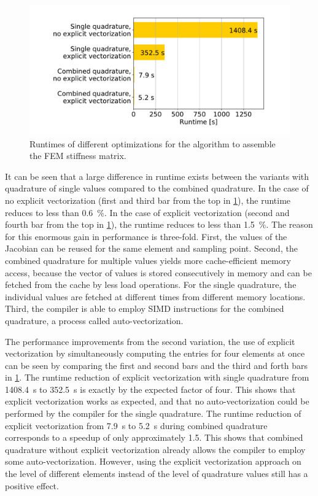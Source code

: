 \begin{figure}%
  \centering%
  \includegraphics[width=\textwidth]{images/implementation/matrix_runtimes.pdf}%
  \caption{Runtimes of different optimizations for the algorithm to assemble the FEM stiffness matrix.}%
  \label{fig:matrix_runtimes}%
\end{figure}%

It can be seen that a large difference in runtime exists between the variants with quadrature of single values compared to the combined quadrature. In the case of no explicit vectorization (first and third bar from the top in \cref{fig:matrix_runtimes}), the runtime reduces to less than \SI{0.6}{\percent}. In the case of explicit vectorization (second and fourth bar from the top in \cref{fig:matrix_runtimes}), the runtime reduces to less than \SI{1.5}{\percent}. The reason for this enormous gain in performance is three-fold. First, the values of the Jacobian can be reused for the same element and sampling point. Second, the combined quadrature for multiple values yields more cache-efficient memory access, because the vector of values is stored consecutively in memory and can be fetched from the cache by less load operations. For the single quadrature, the individual values are fetched at different times from different memory locations.
Third, the compiler is able to employ SIMD instructions for the combined quadrature, a process called auto-vectorization.

The performance improvements from the second variation, the use of explicit vectorization by simultaneously computing the entries for four elements at once can be seen by comparing the first and second bars and the third and forth bars in \cref{fig:matrix_runtimes}. The runtime reduction of explicit vectorization with single quadrature from \SI{1408.4}{\second} to \SI{352.5}{\second} is exactly by the expected factor of four. This shows that explicit vectorization works as expected, and that no auto-vectorization could be performed by the compiler for the single quadrature. The runtime reduction of explicit vectorization from \SI{7.9}{\second} to \SI{5.2}{\second} during combined quadrature corresponds to a speedup of only approximately \num{1.5}. This shows that combined quadrature without explicit vectorization already allows the compiler to employ some auto-vectorization. However, using the explicit vectorization approach on the level of different elements instead of the level of quadrature values still has a positive effect. 

